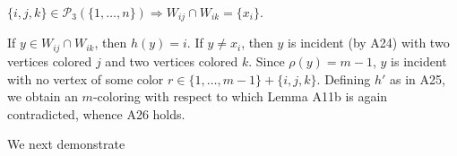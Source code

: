 $\{i, j, k\} \in \mathcal{P}_3(\{1, \ldots, n\}) \Rightarrow W_{ij} \cap W_{ik} = \{x_i\}$.

If $y \in W_{ij} \cap W_{ik}$, then $h(y) = i$. If $y \neq x_i$, then $y$ is incident (by A24) with two vertices colored $j$ and two vertices colored $k$. Since $\rho(y) = m - 1$, $y$ is incident with no vertex of some color $r \in \{1, \ldots, m - 1\} + \{i, j, k\}$. Defining $h'$ as in A25, we obtain an $m$-coloring with respect to which Lemma A11b is again contradicted, whence A26 holds.

We next demonstrate
